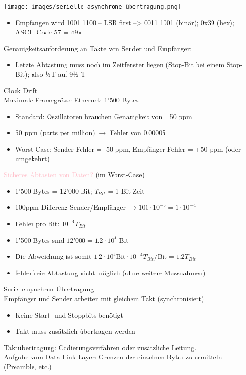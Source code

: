 \begin{example}
    \texttt{[image: images/serielle\_asynchrone\_übertragung.png]}
    \begin{itemize}
        \item Empfangen wird 1001 1100 – LSB first –> 0011 1001 (binär); 0x39 (hex); ASCII Code 57 = «9»
    \end{itemize}
    Genauigkeitsanforderung an Takte von Sender und Empfänger:
    \begin{itemize}
        \item Letzte Abtastung muss noch im Zeitfenster liegen (Stop-Bit bei einem Stop-Bit); also ½T auf 9½ T
    \end{itemize}
\end{example}

\begin{KR}{Clock Drift}\\
    Maximale Framegrösse Ethernet: 1’500 Bytes.
    \begin{itemize}
        \item Standard: Oszillatoren brauchen Genauigkeit von ±50 ppm 
        \item 50 ppm (parts per million) $\rightarrow$ Fehler von 0.00005
        \item Worst-Case: Sender Fehler = -50 ppm, Empfänger Fehler = +50 ppm (oder umgekehrt)
    \end{itemize}
    \textcolor{pink}{Sicheres Abtasten von Daten?} (im Worst-Case)
    \begin{itemize}
        \item 1'500 Bytes = 12'000 Bit; $T_{Bit}$ = 1 Bit-Zeit
        \item 100ppm Differenz Sender/Empfänger $\rightarrow 100 \cdot 10^{-6} = 1 \cdot 10^{-4}$
        \item Fehler pro Bit: $10^{-4} T_{Bit}$
        \item 1’500 Bytes sind $12’000 = 1.2 \cdot 10^4$ Bit
        \item Die Abweichung ist somit $1.2 \cdot 10^4 \text{Bit} \cdot 10^{-4} T_{Bit} / \text{Bit} = 1.2 T_{Bit}$
        \item fehlerfreie Abtastung nicht möglich (ohne weitere Massnahmen)
    \end{itemize}
\end{KR}

\begin{definition}{Serielle synchron Übertragung}\\
    Empfänger und Sender arbeiten mit gleichem Takt (synchronisiert)
    \begin{itemize}
        \item Keine Start- und Stoppbits benötigt
        \item Takt muss zusätzlich übertragen werden
    \end{itemize}
    Taktübertragung: Codierungsverfahren oder zusätzliche Leitung. \\
    Aufgabe vom Data Link Layer: Grenzen der einzelnen Bytes zu ermitteln (Preamble, etc.)
\end{definition}

